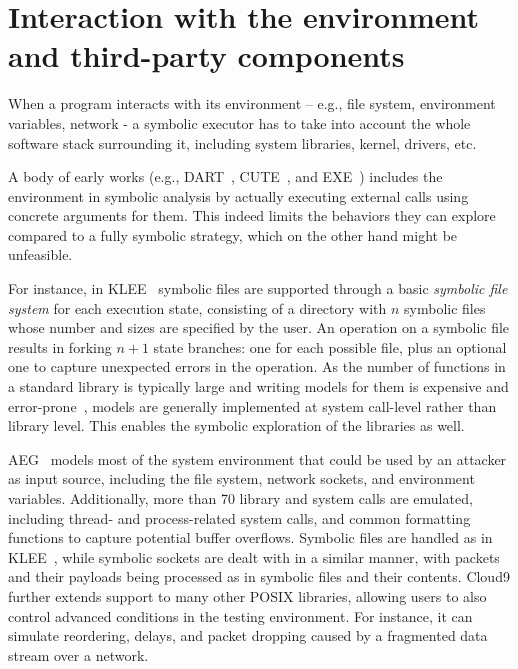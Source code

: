 \section{Interaction with the environment and third-party components}
\label{se:environment-thirdparty}

When a program interacts with its environment -- e.g., file system, environment variables, network - a symbolic executor has to take into account the whole software stack surrounding it, including system libraries, kernel, drivers, etc.

A body of early works (e.g., {\sc DART}~\cite{DART-PLDI05},  {\sc CUTE}~\cite{CUTE-FSE05}, and {\sc EXE}~\cite{EXE-CCS06}) includes the environment in symbolic analysis by actually executing external calls using concrete arguments for them. This indeed limits the behaviors they can explore compared to a fully symbolic strategy, which on the other hand might be unfeasible. 

 For instance, in {\sc KLEE}~\cite{KLEE-OSDI08} symbolic files are supported through a basic {\em symbolic file system} for each execution state, consisting of a directory with $n$ symbolic files whose number and sizes are specified by the user. An operation on a symbolic file results in forking $n+1$ state branches: one for each possible file, plus an optional one to capture unexpected errors in the operation. As the number of functions in a standard library is typically large and writing models for them is expensive and error-prone~\cite{Ball06}, models are generally implemented at system call-level rather than library level. This enables the symbolic exploration of the libraries as well.

{\sc AEG}~\cite{AEG-NDSS11} models most of the system environment that could be used by an attacker as input source, including the file system, network sockets, and environment variables. Additionally, more than 70 library and system calls are emulated, including thread- and process-related system calls, and common formatting functions to capture potential buffer overflows. Symbolic files are handled as in {\sc KLEE}~\cite{KLEE-OSDI08}, while symbolic sockets are dealt with in a similar manner, with packets and their payloads being processed as in symbolic files and their contents. {\sc Cloud9} further extends support to many other POSIX libraries, allowing users to also control advanced conditions in the testing environment. For instance, it can simulate reordering, delays, and packet dropping caused by a fragmented data stream over a network.

